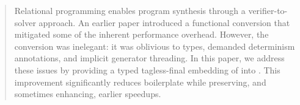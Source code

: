 \begin{abstract}
  Relational programming enables program synthesis through a verifier-to-solver approach. 
  An earlier paper introduced a functional conversion that mitigated some of the inherent performance overhead. 
  However, the conversion was inelegant: it was oblivious to types, demanded determinism annotations, and implicit generator threading. 
  In this paper, we address these issues by providing a typed tagless-final embedding of \mk into \haskell. 
  This improvement significantly reduces boilerplate while preserving, and sometimes enhancing, earlier speedups. 
\end{abstract}